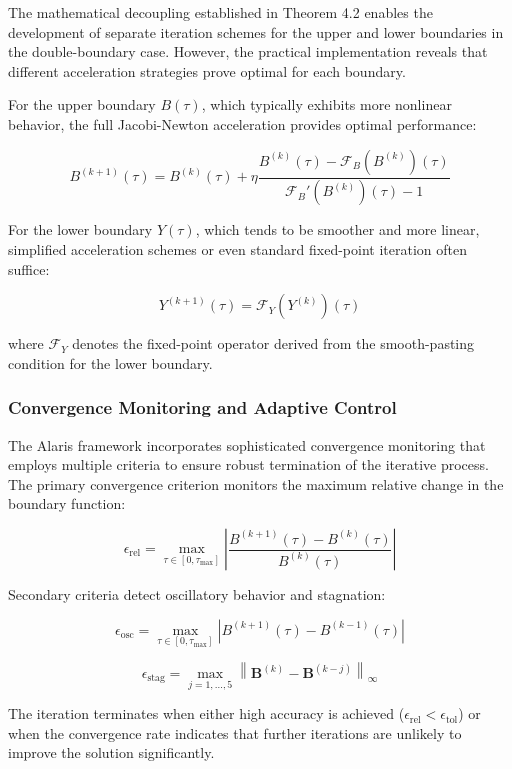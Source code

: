 \documentclass[
  11pt,
  11pt,
  letterpaper,
  onecolumn]{article}
\begin{document}
The mathematical decoupling established in Theorem 4.2 enables the
development of separate iteration schemes for the upper and lower
boundaries in the double-boundary case. However, the practical
implementation reveals that different acceleration strategies prove
optimal for each boundary.

For the upper boundary \(B(\tau)\), which typically exhibits more
nonlinear behavior, the full Jacobi-Newton acceleration provides optimal
performance:

\[B^{(k+1)}(\tau) = B^{(k)}(\tau) + \eta \frac{B^{(k)}(\tau) - \mathcal{F}_B(B^{(k)})(\tau)}{\mathcal{F}_B'(B^{(k)})(\tau) - 1} \tag{6.7}\]

For the lower boundary \(Y(\tau)\), which tends to be smoother and more
linear, simplified acceleration schemes or even standard fixed-point
iteration often suffice:

\[Y^{(k+1)}(\tau) = \mathcal{F}_Y(Y^{(k)})(\tau) \tag{6.8}\]

where \(\mathcal{F}_Y\) denotes the fixed-point operator derived from
the smooth-pasting condition for the lower boundary.

\subsubsection{Convergence Monitoring and Adaptive
Control}\label{convergence-monitoring-and-adaptive-control}

The Alaris framework incorporates sophisticated convergence monitoring
that employs multiple criteria to ensure robust termination of the
iterative process. The primary convergence criterion monitors the
maximum relative change in the boundary function:

\[\epsilon_{\text{rel}} = \max_{\tau \in [0,\tau_{\max}]} \left|\frac{B^{(k+1)}(\tau) - B^{(k)}(\tau)}{B^{(k)}(\tau)}\right| \tag{6.9}\]

Secondary criteria detect oscillatory behavior and stagnation:

\[\epsilon_{\text{osc}} = \max_{\tau \in [0,\tau_{\max}]} \left|B^{(k+1)}(\tau) - B^{(k-1)}(\tau)\right| \tag{6.10}\]

\[\epsilon_{\text{stag}} = \max_{j=1,\ldots,5} \left\|\mathbf{B}^{(k)} - \mathbf{B}^{(k-j)}\right\|_{\infty} \tag{6.11}\]

The iteration terminates when either high accuracy is achieved
(\(\epsilon_{\text{rel}} < \epsilon_{\text{tol}}\)) or when the
convergence rate indicates that further iterations are unlikely to
improve the solution significantly.
\end{document}
